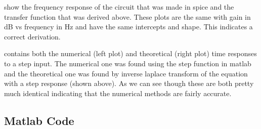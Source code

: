 \documentclass[a4paper, 12pt]{article}
\begin{document}
     show the frequency response of the circuit that was made in spice and the transfer function that was derived above. These plots are the same with gain in dB vs frequency in Hz and have the same intercepts and shape. This indicates a correct derivation.
    \par
     contains both the numerical (left plot) and theoretical (right plot) time responses to a step input. The numerical one was found using the step function in matlab and the theoretical one was found by inverse laplace transform of the equation with a step response (shown above). As we can see though these are both pretty much identical indicating that the numerical methods are fairly accurate.
    \begin{appendices}
        \section{Matlab Code}\label{app:code}
            
    \end{appendices}
\end{document}
